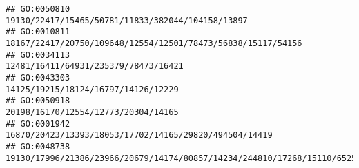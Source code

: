 \documentclass[
]{article}
\begin{document}
\begin{verbatim}
## GO:0050810                                                                                                                                                                                                                                                                                                                                                            19130/22417/15465/50781/11833/382044/104158/13897
## GO:0010811                                                                                                                                                                                                                                                                                                                                                 18167/22417/20750/109648/12554/12501/78473/56838/15117/54156
## GO:0034113                                                                                                                                                                                                                                                                                                                                                                         12481/16411/64931/235379/78473/16421
## GO:0043303                                                                                                                                                                                                                                                                                                                                                                          14125/19215/18124/16797/14126/12229
## GO:0050918                                                                                                                                                                                                                                                                                                                                                                          20198/16170/12554/12773/20304/14165
## GO:0001942                                                                                                                                                                                                                                                                                                                                                       16870/20423/13393/18053/17702/14165/29820/494504/14419
## GO:0048738                                                                                                                                                                                                                                                                                                           19130/17996/21386/23966/20679/14174/80857/14234/244810/17268/15110/65256/218772/18092/21380/225288

\end{verbatim}
\end{document}
